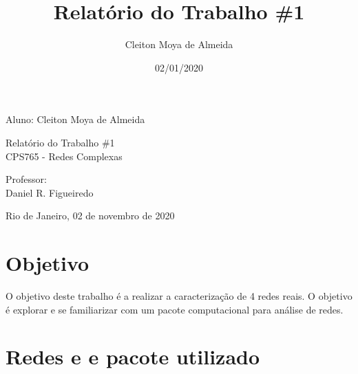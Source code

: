 \documentclass[12pt,a4paper]{article}
\author{\large Cleiton Moya de Almeida}
\title{Relatório do Trabalho \#1}
\date{02/01/2020}
\begin{document}
	
	\begin{titlepage}
	
		\begin{center}
			\Large{Aluno: Cleiton Moya de Almeida}
			\vspace{10cm}
			
			\Huge{Relatório do Trabalho \#1} \\
			\Large{CPS765 - Redes Complexas}	
		\end{center}
		\vspace{5cm}
		\begin{flushleft}\large{
			Professor: \\
			Daniel R. Figueiredo \\
		}
		\end{flushleft}
			\vspace{3cm}
		\begin{center}
			Rio de Janeiro, 02 de novembro de 2020
		\end{center}
	
	\end{titlepage}
	
	\pagebreak
	
	\section{Objetivo}
	
	O objetivo deste trabalho é a realizar a caracterização de 4 redes reais. O objetivo é explorar e se familiarizar com um pacote computacional para análise de redes.
	
	\section{Redes e e pacote utilizado}
	
\end{document}
